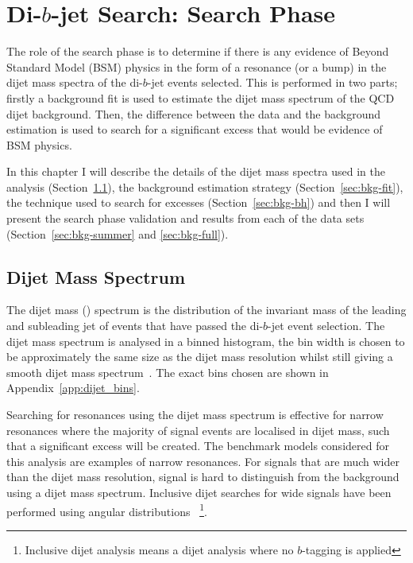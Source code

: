 \chapter{Di-$b$-jet Search: Search Phase}
\label{sec:bkg}

The role of the search phase is to determine if there is any evidence of Beyond Standard Model (BSM)
physics in the form of a resonance (or a bump) in the dijet mass spectra of the di-$b$-jet events selected.
This is performed in two parts; firstly a background fit is used to estimate
the dijet mass spectrum of the QCD dijet background.
Then, the difference between the data and the background estimation is used 
to search for a significant excess that would be evidence of BSM physics.

In this chapter I will describe
the details of the dijet mass  spectra used in the analysis (Section~\ref{sec:bkg-mjj}),
the background estimation strategy (Section~\ref{sec:bkg-fit}),
the technique used to search for excesses (Section~\ref{sec:bkg-bh})
and then I will present the search phase validation and results from each of the data sets (Section~\ref{sec:bkg-summer} and \ref{sec:bkg-full}).

\section{Dijet Mass Spectrum}
\label{sec:bkg-mjj}

The dijet mass (\mjj) spectrum
is the distribution of the invariant mass of the leading and subleading jet
of events that have passed the di-$b$-jet event selection.
The dijet mass spectrum is analysed in a binned histogram,
the bin width is chosen to be approximately the same size as the dijet mass resolution
whilst still giving a smooth dijet mass spectrum~\cite{dijet-mori16_int}.
The exact bins chosen are shown in Appendix~\ref{app:dijet_bins}.

Searching for resonances using the dijet mass spectrum is effective
for narrow resonances where the majority of signal events are localised in dijet mass,
such that a significant excess will be created.
The benchmark models considered for this analysis are examples of narrow resonances.
For signals that are much wider than the dijet mass resolution,
signal is hard to distinguish from the background using a dijet mass spectrum.
Inclusive dijet searches for wide signals have been performed using angular distributions~\cite{dijet-mori16_paper}
\footnote{Inclusive dijet analysis means a dijet analysis where no $b$-tagging is applied}.

